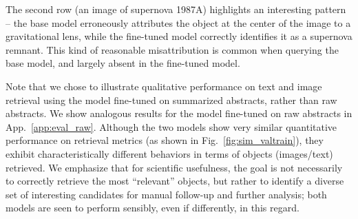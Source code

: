 \documentclass[10pt]{article} %
\begin{document}
The second row (an image of supernova 1987A) highlights an interesting pattern -- the base model erroneously attributes the object at the center of the image to a gravitational lens, while the fine-tuned model correctly identifies it as a supernova remnant. This kind of reasonable misattribution is common when querying the base model, and largely absent in the fine-tuned model.

Note that we chose to illustrate qualitative performance on text and image retrieval using the model fine-tuned on summarized abstracts, rather than raw abstracts. We show analogous results for the model fine-tuned on raw abstracts in App.~\ref{app:eval_raw}. Although the two models show very similar quantitative performance on retrieval metrics (as shown in Fig.~\ref{fig:sim_valtrain}), they exhibit characteristically different behaviors in terms of objects (images/text) retrieved. We emphasize that for scientific usefulness, the goal is not necessarily to correctly retrieve the most ``relevant'' objects, but rather to identify a diverse set of interesting candidates for manual follow-up and further analysis; both models are seen to perform sensibly, even if differently, in this regard.
\end{document}
